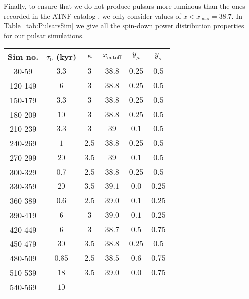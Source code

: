\documentclass[aps,prd,twocolumn,amsmath,superscriptaddress,amssymb,showpacs,floatfix,nofootinbib]{revtex4-1}
\begin{document}
\begin{appendix}
Finally, to ensure that we do not produce pulsars more luminous
than the ones recorded in the ATNF catalog
\cite{Manchester:2004bp, ATNFSite}, we only consider values of
$x < x_{\textrm{max}} = 38.7$. In
Table~\ref{tab:PulsarsSim} we give all the spin-down power
distribution properties for our pulsar simulations.



\begin{table}[t]
	\centering
	\small %
	\begin{tabular}{c | *{5}{c}} 

Sim no. 	
& $\tau_{0}$ (kyr) 	
& $\kappa$ 	
& $x_{\textrm{cutoff}}$ 	
& $y_{\mu}$ 	
& $y_{\sigma}$ 	
\\
\hline
		30-59 	
		& $3.3$ 	
		& $3$ 	
		& $38.8$ 	
		& $0.25$ 	
		& $0.5$ 	
		\\
		\hline
		120-149	
		& $6$ 	
		& $3$ 	
		& $38.8$ 	
		& $0.25$ 	
		& $0.5$ 	
		\\
		150-179	
		& $3.3$ 	
		& $3$ 	
		& $38.8$ 	
		& $0.25$ 	
		& $0.5$ 	
		\\
		180-209	
		& $10$ 	
		& $3$ 	
		& $38.8$ 	
		& $0.25$ 	
		& $0.5$ 	
		\\
		210-239	
		& $3.3$ 	
		& $3$ 	
		& $39$ 	
		& $0.1$ 	
		& $0.5$ 	
		\\
		240-269	
		& $1$ 	
		& $2.5$ 	
		& $38.8$ 	
		& $0.25$ 	
		& $0.5$ 	
		\\
		270-299
		& $20$ 	
		& $3.5$ 	
		& $39$ 	
		& $0.1$ 	
		& $0.5$ 	
		\\
		300-329
		& $0.7$ 	
		& $2.5$ 	
		& $38.8$ 	
		& $0.25$ 	
		& $0.5$ 	
		\\
		330-359
		& $20$ 	
		& $3.5$ 	
		& $39.1$ 	
		& $0.0$ 	
		& $0.25$ 		
		\\
		360-389
		& $0.6$ 	
		& $2.5$ 	
		& $39.0$ 	
		& $0.1$ 	
		& $0.25$ 	
		\\
		390-419
		& $6$ 	
		& $3$ 	
		& $39.0$ 	
		& $0.1$ 	
		& $0.25$ 	
		\\
		420-449
		& $6$ 	
		& $3$ 	
		& $38.7$ 	
		& $0.5$ 	
		& $0.75$ 	
		\\
		450-479 	
		& $30$ 	
		& $3.5$ 	
		& $38.8$ 	
		& $0.25$ 	
		& $0.5$ 	
		\\
		480-509
		& $0.85$ 	
		& $2.5$ 	
		& $38.5$ 	
		& $0.6$ 	
		& $0.75$ 	 	
		\\
		510-539
		& $18$ 	
		& $3.5$ 	
		& $39.0$ 	
		& $0.0$ 	
		& $0.75$ 		
		\\
		540-569 	
		& $10$ 	

\end{tabular}
\end{table}
\end{appendix}
\end{document}
